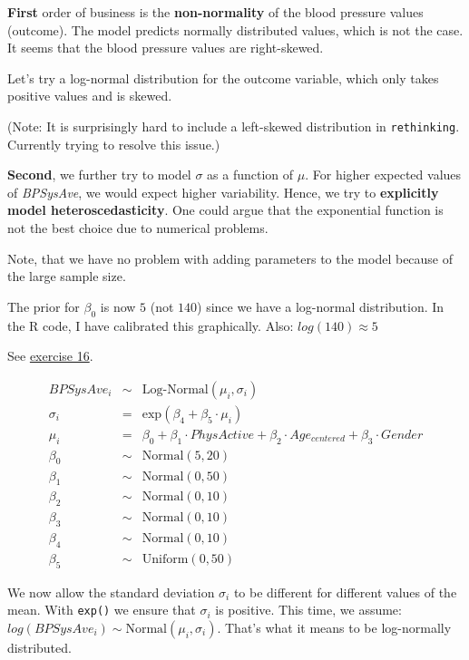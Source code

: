 \documentclass[
]{book}
\begin{document}
\textbf{First} order of business is the \textbf{non-normality} of the blood pressure values (outcome).
The model predicts normally distributed values, which is not the case.
It seems that the blood pressure values are right-skewed.

Let's try a log-normal distribution for the outcome variable, which only
takes positive values and is skewed.

(Note: It is surprisingly hard to include a left-skewed distribution in \texttt{rethinking}.
Currently trying to resolve this issue.)

\textbf{Second}, we further try to model \(\sigma\) as a function of \(\mu\).
For higher expected values of \emph{BPSysAve}, we would expect higher variability.
Hence, we try to \textbf{explicitly model heteroscedasticity}.
One could argue that the exponential function is not the best choice due
to numerical problems.

Note, that we have no problem with adding parameters to the model
because of the large sample size.

The prior for \(\beta_0\) is now \(5\) (not \(140\)) since we have a
log-normal distribution. In the R code, I have calibrated this graphically.
Also: \(log(140) \approx 5\)

See \hyperref[exercise16_multiple_regression]{exercise 16}.

\begin{eqnarray*}
BPSysAve_i &\sim& \text{Log-Normal}(\mu_i, \sigma_i)\\
\sigma_i &=& \text{exp}(\beta_4 + \beta_5 \cdot \mu_i)\\
\mu_i &=& \beta_0 + \beta_1 \cdot PhysActive + \beta_2 \cdot Age_{centered} + \beta_3 \cdot Gender\\
\beta_0 &\sim& \text{Normal}(5, 20)\\
\beta_1 &\sim& \text{Normal}(0, 50)\\
\beta_2 &\sim& \text{Normal}(0, 10)\\
\beta_3 &\sim& \text{Normal}(0, 10)\\
\beta_4 &\sim& \text{Normal}(0, 10)\\
\beta_5 &\sim& \text{Uniform}(0, 50)
\end{eqnarray*}

We now allow the standard deviation \(\sigma_i\) to be different for different values of the mean.
With \texttt{exp()} we ensure that \(\sigma_i\) is positive.
This time, we assume: \(log(BPSysAve_i) \sim \text{Normal}(\mu_i, \sigma_i)\). That's what it means
to be log-normally distributed.
\end{document}
